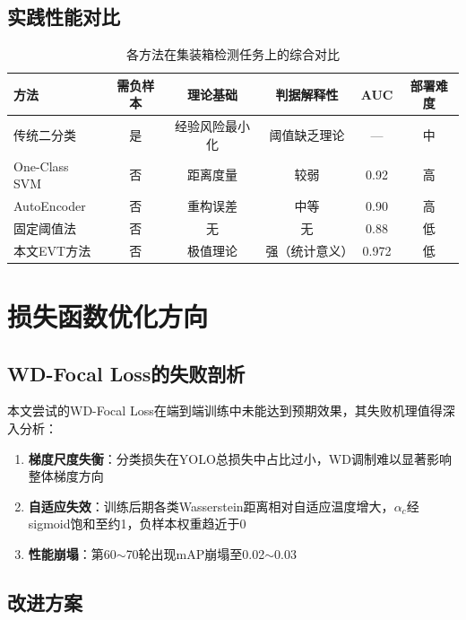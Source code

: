 \documentclass[12pt,a4paper]{ctexart}
\theoremstyle{cumcm}
\begin{document}
\subsection{实践性能对比}

\begin{table}[H]
\centering
{}
\caption{各方法在集装箱检测任务上的综合对比}
\begin{tabular}{lccccc}
\toprule
\textbf{方法} & \textbf{需负样本} & \textbf{理论基础} & \textbf{判据解释性} & \textbf{AUC} & \textbf{部署难度} \\
\midrule
传统二分类 & 是 & 经验风险最小化 & 阈值缺乏理论 & — & 中 \\
One-Class SVM & 否 & 距离度量 & 较弱 & 0.92 & 高 \\
AutoEncoder & 否 & 重构误差 & 中等 & 0.90 & 高 \\
固定阈值法 & 否 & 无 & 无 & 0.88 & 低 \\
本文EVT方法 & 否 & 极值理论 & 强（统计意义） & 0.972 & 低 \\
\bottomrule
\end{tabular}
\end{table}

\section{损失函数优化方向}

\subsection{WD-Focal Loss的失败剖析}

本文尝试的WD-Focal Loss在端到端训练中未能达到预期效果，其失败机理值得深入分析：

\begin{enumerate}[leftmargin=2.2em,itemsep=2pt]
\item \textbf{梯度尺度失衡}：分类损失在YOLO总损失中占比过小，WD调制难以显著影响整体梯度方向
\item \textbf{自适应失效}：训练后期各类Wasserstein距离相对自适应温度增大，$\alpha_c$经sigmoid饱和至约1，负样本权重趋近于0
\item \textbf{性能崩塌}：第60$\sim$70轮出现mAP崩塌至0.02$\sim$0.03
\end{enumerate}

\subsection{改进方案}
\end{document}
